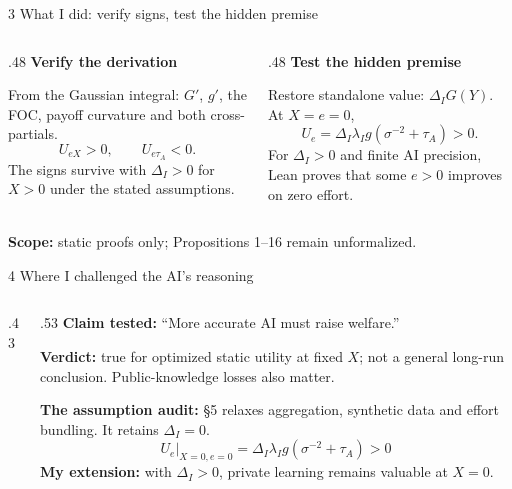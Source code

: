 \documentclass[11pt,aspectratio=169]{beamer}
\begin{document}
\begin{frame}{3 \enspace What I did: verify signs, test the hidden premise}
\begin{columns}[T]
\begin{column}{.48\textwidth}
\textbf{Verify the derivation}\par\medskip
From the Gaussian integral: $G'$, $g'$, the FOC, payoff curvature and both cross-partials.
\[
 U_{eX}>0,\qquad U_{e\tau_A}<0.
\]
The signs survive with $\Delta_I>0$ for $X>0$ under the stated assumptions.
\end{column}
\begin{column}{.48\textwidth}
\textbf{Test the hidden premise}\par\medskip
Restore standalone value: $\Delta_I G(Y)$. At $X=e=0$,
\[
 U_e=\Delta_I\lambda_I g(\sigma^{-2}+\tau_A)>0.
\]
For $\Delta_I>0$ and finite AI precision, Lean proves that some $e>0$ improves on zero effort.
\end{column}
\end{columns}
\medskip
\textbf{Scope:} static proofs only; Propositions 1--16 remain unformalized.
\end{frame}

\begin{frame}{4 \enspace Where I challenged the AI's reasoning}
\begin{columns}[T]
\begin{column}{.43\textwidth}
\end{column}
\begin{column}{.53\textwidth}
\small
\textbf{Claim tested:} ``More accurate AI must raise welfare.''
\medskip

\textbf{Verdict:} true for optimized static utility at fixed $X$; not a general
long-run conclusion. Public-knowledge losses also matter.
\medskip

\textbf{The assumption audit:} \S5 relaxes aggregation, synthetic data and effort bundling.
It retains $\Delta_I=0$.
\[
 U_e\big|_{X=0,e=0}=\Delta_I\lambda_I
 g(\sigma^{-2}+\tau_A)>0
\]
\textbf{My extension:} with $\Delta_I>0$, private learning remains valuable at $X=0$.
\end{column}
\end{columns}
\end{frame}
\end{document}
